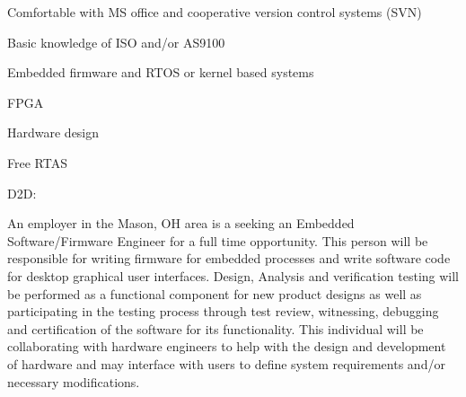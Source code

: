 \par Comfortable with MS office and cooperative version control systems (SVN)
\par Basic knowledge of ISO and/or AS9100
\par Embedded firmware and RTOS or kernel based systems
\par FPGA
\par Hardware design
\par Free RTAS
\par D2D:
\par An employer in the Mason, OH area is a seeking an Embedded Software/Firmware Engineer for a full time opportunity. This person will be responsible for writing firmware for embedded processes and write software code for desktop graphical user interfaces. Design, Analysis and verification testing will be performed as a functional component for new product designs as well as participating in the testing process through test review, witnessing, debugging and certification of the software for its functionality. This individual will be collaborating with hardware engineers to help with the design and development of hardware and may interface with users to define system requirements and/or necessary modifications.

\bye
